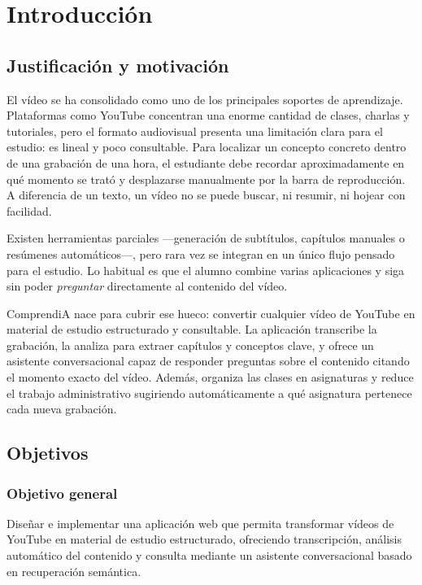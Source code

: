 \chapter{Introducción}
\label{cap:introduccion}

\section{Justificación y motivación}

El vídeo se ha consolidado como uno de los principales soportes de aprendizaje. Plataformas
como YouTube concentran una enorme cantidad de clases, charlas y tutoriales, pero el formato
audiovisual presenta una limitación clara para el estudio: es lineal y poco consultable. Para
localizar un concepto concreto dentro de una grabación de una hora, el estudiante debe recordar
aproximadamente en qué momento se trató y desplazarse manualmente por la barra de
reproducción. A diferencia de un texto, un vídeo no se puede buscar, ni resumir, ni hojear con
facilidad.

Existen herramientas parciales —generación de subtítulos, capítulos manuales o resúmenes
automáticos—, pero rara vez se integran en un único flujo pensado para el estudio. Lo habitual
es que el alumno combine varias aplicaciones y siga sin poder \textit{preguntar} directamente
al contenido del vídeo.

ComprendiA nace para cubrir ese hueco: convertir cualquier vídeo de YouTube en material de
estudio estructurado y consultable. La aplicación transcribe la grabación, la analiza para
extraer capítulos y conceptos clave, y ofrece un asistente conversacional capaz de responder
preguntas sobre el contenido citando el momento exacto del vídeo. Además, organiza las clases
en asignaturas y reduce el trabajo administrativo sugiriendo automáticamente a qué asignatura
pertenece cada nueva grabación.

\section{Objetivos}

\subsection{Objetivo general}

Diseñar e implementar una aplicación web que permita transformar vídeos de YouTube en material
de estudio estructurado, ofreciendo transcripción, análisis automático del contenido y consulta
mediante un asistente conversacional basado en recuperación semántica.

